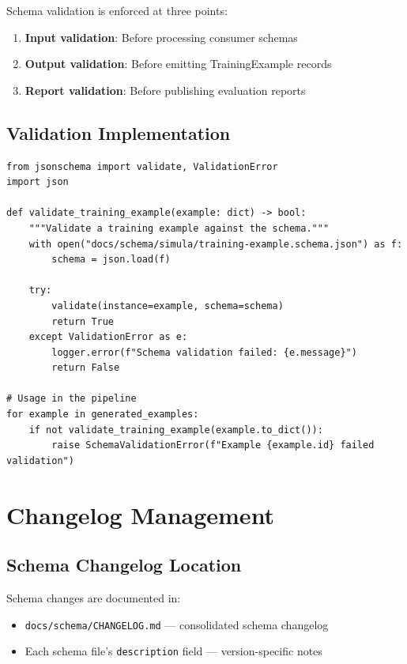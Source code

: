 Schema validation is enforced at three points:

\begin{enumerate}
  \item \textbf{Input validation}: Before processing consumer schemas
  \item \textbf{Output validation}: Before emitting TrainingExample records
  \item \textbf{Report validation}: Before publishing evaluation reports
\end{enumerate}

\subsection{Validation Implementation}

\begin{lstlisting}[language=jsonx,caption={Schema validation in the pipeline.}]
from jsonschema import validate, ValidationError
import json

def validate_training_example(example: dict) -> bool:
    """Validate a training example against the schema."""
    with open("docs/schema/simula/training-example.schema.json") as f:
        schema = json.load(f)
    
    try:
        validate(instance=example, schema=schema)
        return True
    except ValidationError as e:
        logger.error(f"Schema validation failed: {e.message}")
        return False

# Usage in the pipeline
for example in generated_examples:
    if not validate_training_example(example.to_dict()):
        raise SchemaValidationError(f"Example {example.id} failed validation")
\end{lstlisting}

\section{Changelog Management}

\subsection{Schema Changelog Location}

Schema changes are documented in:
\begin{itemize}
  \item \texttt{docs/schema/CHANGELOG.md} --- consolidated schema changelog
  \item Each schema file's \texttt{description} field --- version-specific notes
\end{itemize}

